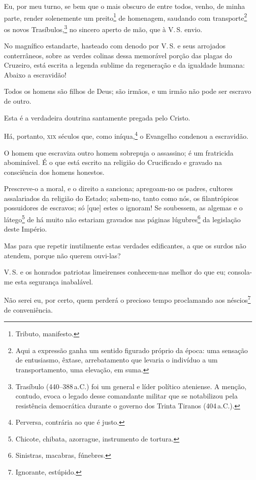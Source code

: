 Eu, por meu turno, se bem que o mais obscuro de entre todos, venho, de
minha parte, render solenemente um preito\footnote{Tributo, manifesto.}
de homenagem, saudando com transporte\footnote{Aqui a expressão ganha
  um sentido figurado próprio da época: uma sensação de entusiasmo,
  êxtase, arrebatamento que levaria o indivíduo a um transportamento,
  uma elevação, em suma.} os novos Trasíbulos,\footnote{Trasíbulo
  (440--388\,a.C.) foi um general e líder político ateniense. A menção,
  contudo, evoca o legado desse comandante militar que se notabilizou
  pela resistência democrática durante o governo dos Trinta Tiranos (404\,a.C.).}
  no sincero aperto de mão, que à V.\,S. envio.

No magnífico estandarte, hasteado com denodo por V.\,S. e seus arrojados
conterrâneos, sobre as verdes colinas dessa memorável porção das plagas
do Cruzeiro, está escrita a legenda sublime da regeneração e da
igualdade humana: Abaixo a escravidão!

Todos os homens são filhos de Deus; são irmãos, e um irmão não pode ser
escravo de outro.

Esta é a verdadeira doutrina santamente pregada pelo Cristo.

Há, portanto, \textsc{xix} séculos que, como iníqua,\footnote{Perversa,
  contrária ao que é justo.} o Evangelho condenou a escravidão.

O homem que escraviza outro homem sobrepuja o assassino; é um fratricida
abominável. É o que está escrito na religião do Crucificado e gravado na
consciência dos homens honestos.

Prescreve-o a moral, e o direito a sanciona; apregoam-no os padres,
cultores assalariados da religião do Estado; sabem-no, tanto como nós,
os filantrópicos possuidores de escravos; só {[}que{]} estes o ignoram!
Se soubessem, as algemas e o látego\footnote{Chicote, chibata,
  azorrague, instrumento de tortura.} de há muito não estariam gravados
nas páginas lúgubres\footnote{Sinistras, macabras, fúnebres.} da
legislação deste Império.

Mas para que repetir inutilmente estas verdades edificantes, a que os
surdos não atendem, porque não querem ouvi-las?

V.\,S. e os honrados patriotas limeirenses conhecem-nas melhor do que eu;
consola-me esta segurança inabalável.

Não serei eu, por certo, quem perderá o precioso tempo proclamando aos
néscios\footnote{Ignorante, estúpido.} de conveniência.

